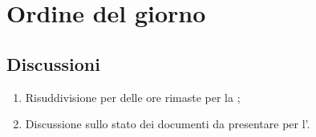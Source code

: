 \section{Ordine del giorno} \label{sec:agenda}
\subsection{Discussioni} \label{subsec:discussione}
\begin{enumerate}
    \item Risuddivisione per  delle ore rimaste per la ;
    \item Discussione sullo stato dei documenti da presentare per l’.

    
\end{enumerate}

